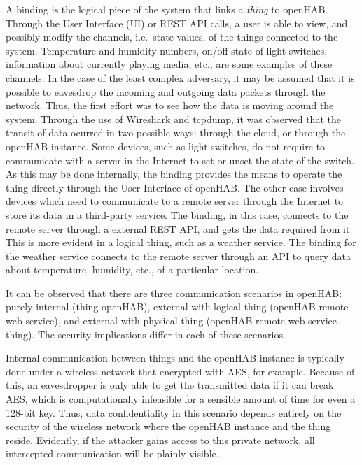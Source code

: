 \documentclass[12pt]{article}
\begin{document}
A binding is the logical piece of the system that links a \emph{thing} to openHAB. Through the User Interface (UI) or REST API calls, a user is able to view, and possibly modify the channels, i.e.\ state values, of the things connected to the system. Temperature and humidity numbers, on/off state of light switches, information about currently playing media, etc., are some examples of these channels. In the case of the least complex adversary, it may be assumed that it is possible to eavesdrop the incoming and outgoing data packets through the network. Thus, the first effort was to see how the data is moving around the system. Through the use of Wireshark and tcpdump, it was observed that the transit of data ocurred in two possible ways: through the cloud, or through the openHAB instance. Some devices, such as light switches, do not require to communicate with a server in the Internet to set or unset the state of the switch. As this may be done internally, the binding provides the means to operate the thing directly through the User Interface of openHAB. The other case involves devices which need to communicate to a remote server through the Internet to store its data in a third-party service. The binding, in this case, connects to the remote server through a external REST API, and gets the data required from it. This is more evident in a logical thing, such as a weather service. The binding for the weather service connects to the remote server through an API to query data about temperature, humidity, etc., of a particular location.

It can be observed that there are three communication scenarios in openHAB: purely internal (thing-openHAB), external with logical thing (openHAB-remote web service), and external with physical thing (openHAB-remote web service-thing). The security implications differ in each of these scenarios.

Internal communication between things and the openHAB instance is typically done under a wireless network that encrypted with AES, for example. Because of this, an eavesdropper is only able to get the transmitted data if it can break AES, which is computationally infeasible for a sensible amount of time for even a 128-bit key. Thus, data confidentiality in this scenario depends entirely on the security of the wireless network where the openHAB instance and the thing reside. Evidently, if the attacker gains access to this private network, all intercepted communication will be plainly visible.
\end{document}
